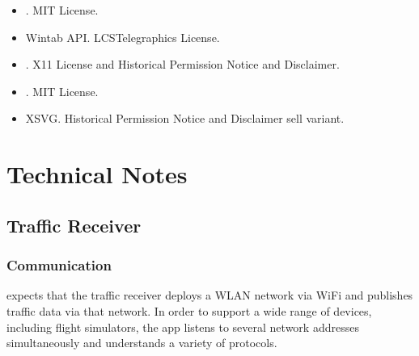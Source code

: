 \documentclass[letterpaper,10pt,english]{sphinxmanual}
\begin{document}
\begin{itemize}
\item {} 
\sphinxAtStartPar
{}%
\begin{footnote}[85]\sphinxAtStartFootnote
{}
%
\end{footnote}. MIT License.

\item {} 
\sphinxAtStartPar
Wintab API. LCS\sphinxhyphen{}Telegraphics License.

\item {} 
\sphinxAtStartPar
{}%
\begin{footnote}[86]\sphinxAtStartFootnote
{}
%
\end{footnote}. X11 License and Historical Permission Notice and Disclaimer.

\item {} 
\sphinxAtStartPar
{}%
\begin{footnote}[87]\sphinxAtStartFootnote
{}
%
\end{footnote}. MIT License.

\item {} 
\sphinxAtStartPar
XSVG. Historical Permission Notice and Disclaimer \sphinxhyphen{} sell variant.

\end{itemize}


\chapter{Technical Notes}
\label{\detokenize{04-appendix/technical:technical-notes}}\label{\detokenize{04-appendix/technical::doc}}

\section{Traffic Receiver}
\label{\detokenize{04-appendix/technical:traffic-receiver}}

\subsection{Communication}
\label{\detokenize{04-appendix/technical:communication}}
\sphinxAtStartPar
{} expects that the traffic receiver deploys a WLAN
network via Wi\sphinxhyphen{}Fi and publishes traffic data via that network.  In order to
support a wide range of devices, including flight simulators, the app listens to
several network addresses simultaneously and understands a variety of protocols.
\end{document}
